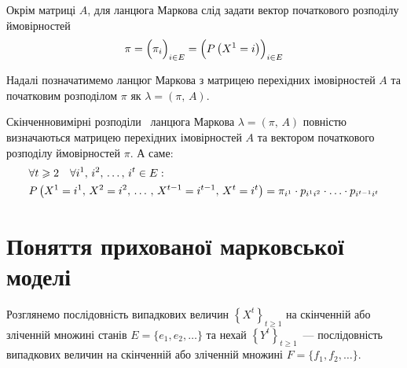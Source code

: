 Окрім матриці $A$, для ланцюга Маркова слід задати вектор початкового розподілу ймовірностей
\begin{equation*}
    \pi = \Bigl( \pi_i \Bigr)_{i \in E} = \Bigl( P\left( X^{1} = i \right) \Bigr)_{i \in E}
\end{equation*}

Надалі позначатимемо ланцюг Маркова з матрицею перехідних імовірностей $A$ та початковим розподілом $\pi$ як $\lambda=(\pi,\,A)$.

Скінченновимірні розподіли~\cite{Norris1997} ланцюга Маркова $\lambda=(\pi,\,A)$ повністю визначаються матрицею перехідних імовірностей $A$ та вектором початкового розподілу ймовірностей $\pi$. А саме:
\begin{align}
    &\forall t\geqslant 2 \quad \forall i^1,\,i^2,\,\ldots,\,i^{t} \in E: \notag \\
    &P\left( X^{1}=i^{1},\,X^{2}=i^{2},\,\ldots\,,\, X^{t-1}=i^{t-1},\, X^{t}=i^{t} \right) = \pi_{i^1} \cdot p_{i^1i^2} \cdot \ldots \cdot p_{i^{t-1}i^{t}} \label{eq: finite-dimensional distributions}
\end{align}

\section{Поняття прихованої марковської моделі}

Розглянемо послідовність випадкових величин $\left\{ X^t \right\}_{t\geqslant 1}$ на скінченній або зліченній множині станів $E=\{e_1,e_2,\ldots\}$ та нехай $\left\{ Y^t \right\}_{t\geqslant 1}$~--- послідовність випадкових величин на скінченній або зліченній множині $F=\{f_1,f_2,\ldots\}$. 

